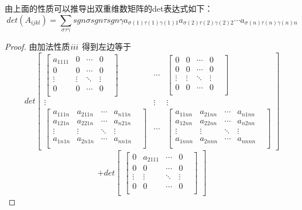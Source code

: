 \documentclass{amsc}          %
\numberwithin{equation}{section} %
\begin{document}
\begin{theorem} 由上面的性质可以推导出双重维数矩阵的det表达式如下：
$$det(A_{ijkl})=\sum \limits_{\sigma\tau\gamma}sgn\sigma sgn\tau sgn\gamma a_{\sigma(1)\tau(1)\gamma(1)1} a_{\sigma(2)\tau(2)\gamma(2)2}\cdots a_{\sigma(n)\tau(n)\gamma(n)n}$$
\end{theorem}
\begin{proof}
由加法性质$\uppercase\expandafter{\romannumeral3}$ 得到左边等于
$$det\begin{bmatrix}
  \begin{bmatrix}
   a_{1111}& 0&\cdots&0\\
   0& 0&\cdots&0\\
  \vdots&\vdots&\ddots &\vdots& \\
0& 0&\cdots&0\\
\end{bmatrix}&
\cdots&
 \begin{bmatrix}
   0& 0&\cdots&0\\
   0& 0&\cdots&0\\
  \vdots&\vdots&\ddots &\vdots& \\
0& 0&\cdots&0\\
\end{bmatrix}\\
\vdots&\vdots&\vdots\\
\begin{bmatrix}
  a_{111n}& a_{211n}&\cdots&a_{n11n}\\
  a_{121n}& a_{221n}&\cdots&a_{n21n}\\
  \vdots&\vdots&\ddots &\vdots& \\
  a_{1n1n}& a_{2n1n}&\cdots&a_{nn1n}\\
  \end{bmatrix}&
\cdots&
\begin{bmatrix}
  a_{11nn}& a_{21nn}&\cdots&a_{n1nn}\\
  a_{12nn}& a_{22nn}&\cdots&a_{n2nn}\\
  \vdots&\vdots&\ddots &\vdots& \\
   a_{1nnn}& a_{2nnn}&\cdots&a_{nnnn}\\
\end{bmatrix}
\end{bmatrix}$$
$$+det\begin{bmatrix}
  \begin{bmatrix}
   0&a_{2111}&\cdots&0\\
   0& 0&\cdots&0\\
  \vdots&\vdots&\ddots &\vdots& \\
0& 0&\cdots&0\\

\end{bmatrix}
\end{bmatrix}$$
\end{proof}
\end{document}
